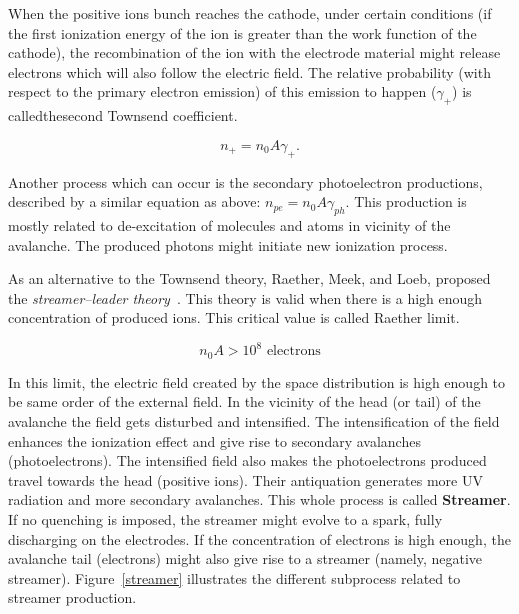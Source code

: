 When the positive ions bunch reaches the cathode, under certain conditions (if the first ionization energy of the ion is greater than the work function of the cathode), the recombination of the ion with the electrode material might release electrons which will also follow the electric field. The relative probability (with respect to the primary electron emission) of this emission to happen ($\gamma_{+}$) is calledthesecond Townsend coefficient.
 
\begin{equation}
    n_{+}=n_{0} A \gamma_{+}.
\end{equation}

Another process which can occur is the secondary photoelectron productions, described by a similar equation as above: $n_{pe}=n_{0} A \gamma_{ph}$. This production is mostly related to de-excitation of molecules and atoms in vicinity of the avalanche. The produced photons might initiate new ionization process.

As an alternative to the Townsend theory, Raether, Meek, and Loeb, proposed the \textit{streamer–leader theory}~\cite{streamer_leader_theory}. This theory is valid when there is a high enough concentration of produced ions. This critical value is called Raether limit.

\begin{equation}
    n_{0} A > 10^{8} \text{ electrons}
\end{equation}

In this limit, the electric field created by the space distribution is high enough to be same order of the external field. In the vicinity of the head (or tail) of the avalanche the field gets disturbed and intensified. The intensification of the field enhances the ionization effect and give rise to secondary avalanches (photoelectrons). The intensified field also makes the photoelectrons produced travel towards the head (positive ions). Their antiquation generates more UV radiation and more secondary avalanches. This whole process is called \textbf{Streamer}. If no quenching is imposed, the streamer might evolve to a spark, fully discharging on the electrodes. If the concentration of electrons is high enough, the avalanche tail (electrons) might also give rise to a streamer (namely, negative streamer). Figure~\ref{streamer} illustrates the different subprocess related to streamer production.


